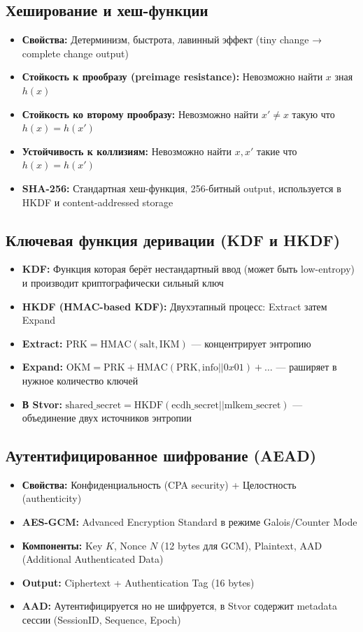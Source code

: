 \documentclass[11pt,a4paper,oneside]{book}
\begin{document}
\vspace{-0.2cm}\subsection{Хеширование и хеш-функции}
\begin{itemize}
  \item \textbf{Свойства:} Детерминизм, быстрота, лавинный эффект (tiny change → complete change output)
  \item \textbf{Стойкость к прообразу (preimage resistance):} Невозможно найти $x$ зная $h(x)$
  \item \textbf{Стойкость ко второму прообразу:} Невозможно найти $x' \neq x$ такую что $h(x) = h(x')$
  \item \textbf{Устойчивость к коллизиям:} Невозможно найти $x, x'$ такие что $h(x) = h(x')$
  \item \textbf{SHA-256:} Стандартная хеш-функция, 256-битный output, используется в HKDF и content-addressed storage
\end{itemize}
\vspace{-0.2cm}\subsection{Ключевая функция деривации (KDF и HKDF)}
\begin{itemize}
  \item \textbf{KDF:} Функция которая берёт нестандартный ввод (может быть low-entropy) и производит криптографически сильный ключ
  \item \textbf{HKDF (HMAC-based KDF):} Двухэтапный процесс: Extract затем Expand
  \item \textbf{Extract:} $\text{PRK} = \text{HMAC}(\text{salt}, \text{IKM})$ — концентрирует энтропию
  \item \textbf{Expand:} $\text{OKM} = \text{PRK} + \text{HMAC}(\text{PRK}, \text{info} || 0x01) + \ldots$ — раширяет в нужное количество ключей
  \item \textbf{В Stvor:} $\text{shared\_secret} = \text{HKDF}(\text{ecdh\_secret} || \text{mlkem\_secret})$ — объединение двух источников энтропии
\end{itemize}
\vspace{-0.2cm}\subsection{Аутентифицированное шифрование (AEAD)}
\begin{itemize}
  \item \textbf{Свойства:} Конфиденциальность (CPA security) + Целостность (authenticity)
  \item \textbf{AES-GCM:} Advanced Encryption Standard в режиме Galois/Counter Mode
  \item \textbf{Компоненты:} Key $K$, Nonce $N$ (12 bytes для GCM), Plaintext, AAD (Additional Authenticated Data)
  \item \textbf{Output:} Ciphertext + Authentication Tag (16 bytes)
  \item \textbf{AAD:} Аутентифицируется но не шифруется, в Stvor содержит metadata сессии (SessionID, Sequence, Epoch)
\end{itemize}
\end{document}
